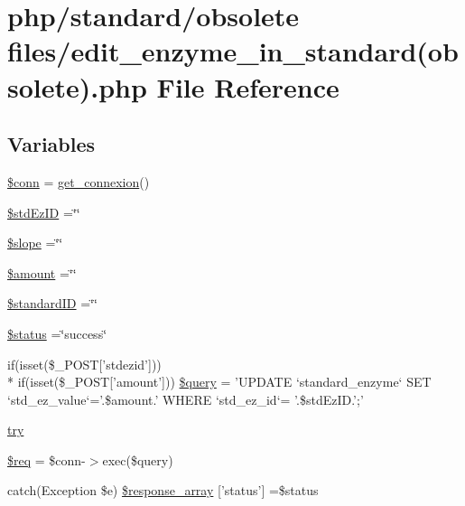 \hypertarget{edit__enzyme__in__standard_07obsolete_08_8php}{\section{php/standard/obsolete files/edit\-\_\-enzyme\-\_\-in\-\_\-standard(obsolete).php File Reference}
\label{edit__enzyme__in__standard_07obsolete_08_8php}
}
\subsection*{Variables}
\begin{DoxyCompactItemize}
\item 
\hyperlink{edit__enzyme__in__standard_07obsolete_08_8php_aa8a5a87b9c1a6a0819b88447cbe41877}{\$conn} = \hyperlink{php__functions_8php_ace18bc10f3fd08f92688ac743e0d8c2e}{get\-\_\-connexion}()
\item 
\hyperlink{edit__enzyme__in__standard_07obsolete_08_8php_a1a82343ffd9662108bf3501398fcd3fb}{\$std\-Ez\-I\-D} =\char`\"{}\char`\"{}
\item 
\hyperlink{edit__enzyme__in__standard_07obsolete_08_8php_aa6841113bca2f461aae7a334e615c44f}{\$slope} =\char`\"{}\char`\"{}
\item 
\hyperlink{edit__enzyme__in__standard_07obsolete_08_8php_af48fe050f529b6ca56356299183b7778}{\$amount} =\char`\"{}\char`\"{}
\item 
\hyperlink{edit__enzyme__in__standard_07obsolete_08_8php_a0c541a369e4a0434108a7d145751bb23}{\$standard\-I\-D} =\char`\"{}\char`\"{}
\item 
\hyperlink{edit__enzyme__in__standard_07obsolete_08_8php_a58391ea75f2d29d5d708d7050b641c33}{\$status} =\char`\"{}success\char`\"{}
\item 
if(isset(\$\-\_\-\-P\-O\-S\-T\mbox{[}'stdezid'\mbox{]})) \\*
if(isset(\$\-\_\-\-P\-O\-S\-T\mbox{[}'amount'\mbox{]})) \hyperlink{edit__enzyme__in__standard_07obsolete_08_8php_a94335fad7539f04bfbbd01ad794fa744}{\$query} = 'U\-P\-D\-A\-T\-E `standard\-\_\-enzyme` S\-E\-T `std\-\_\-ez\-\_\-value`='.\$amount.' W\-H\-E\-R\-E `std\-\_\-ez\-\_\-id`= '.\$std\-Ez\-I\-D.';'
\item 
\hyperlink{edit__enzyme__in__standard_07obsolete_08_8php_abe4cc9788f52e49485473dc699537388}{try}
\item 
\hyperlink{edit__enzyme__in__standard_07obsolete_08_8php_a63a7a283ea5dee8af1e2d5a3435bf370}{\$req} = \$conn-\/$>$exec(\$query)
\item 
catch(Exception \$e) \hyperlink{edit__enzyme__in__standard_07obsolete_08_8php_a8452fb8131316637a04e25f5fde066d9}{\$response\-\_\-array} \mbox{[}'status'\mbox{]} =\$status
\end{DoxyCompactItemize}


